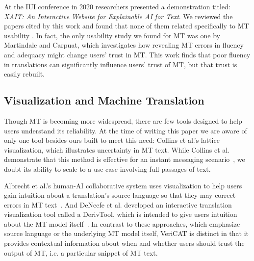 At the IUI conference in 2020 researchers presented a demonstration titled: \textit{XAIT: An Interactive Website for Explainable AI for Text}. We reviewed the papers cited by this work and found that none of them related specifically to MT usability \cite{oduor2020XAIT}. In fact, the only usability study we found for MT was one by Martindale and Carpuat, which investigates how revealing MT errors in fluency and adequacy might change users' trust in MT. This work finds that poor fluency in translations can significantly influence users' trust of MT, but that trust is easily rebuilt\cite{martindaleFluency2018}.       

\subsection{Visualization and Machine Translation}

Though MT is becoming more widespread, there are few tools designed to help users understand its reliability. At the time of writing this paper we are aware of only one tool besides ours built to meet this need: Collins et al.'s lattice visualization, which illustrates uncertainty in MT text. While Collins et al. demonstrate that this method is effective for an instant messaging scenario~\cite{collins2007lattices}, we doubt its ability to scale to a use case involving full passages of text.  

Albrecht et al.'s human-AI collaborative system uses visualization to help users gain intuition about a translation's source language so that they may correct errors in MT text~\cite{albrecht2009chinese}. And DeNeefe et al. developed an interactive translation visualization tool called a DerivTool, which is intended to give users intuition about the MT model itself~\cite{deneefe2005interactively}. In contrast to these approaches, which emphasize source language or the underlying MT model itself, VeriCAT is distinct in that it provides contextual information about when and whether users should trust the output of MT, i.e. a particular snippet of MT text. 


